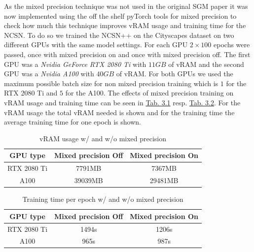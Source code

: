 As the mixed precision technique was not used in the original SGM paper \cite{score_3} it was now implemented using the off the shelf pyTorch tools for mixed precision to check how much this technique improves vRAM usage and training time for the NCSN. To do so we trained the NCSN++ on the Cityscapes dataset on two different GPUs with the same model settings. For each GPU $2\times100$ epochs were passed, once with mixed precision on and once with mixed precision off. The first GPU was a \textit{Nvidia GeForce RTX 2080 Ti} with $11GB$ of vRAM and the second GPU was a \textit{Nvidia A100} with $40GB$ of vRAM. For both GPUs we used the maximum possible batch size for non mixed precision training which is $1$ for the RTX 2080 Ti and $5$ for the A100. The effects of mixed precision training on vRAM usage and training time can be seen in \hyperref[tab:3.1]{Tab. 3.1} resp. \hyperref[tab:3.1]{Tab. 3.2}. For the vRAM usage the total vRAM needed is shown and for the training time the average training time for one epoch is shown.
%
\begin{table}[] \label{tab:3.1}
        \centering
    \begin{tabular}{c|c|c}
        \toprule
        GPU type        & Mixed precision \textbf{Off}    & Mixed precision \textbf{On} \\
        \midrule
        RTX 2080 Ti     &  7791MB               & 7367MB\\
        A100            &  39039MB              & 29481MB\\
        \bottomrule
    \end{tabular}
    \caption{vRAM usage w/ and w/o mixed precision}
\end{table}
\begin{table}[b] \label{tab:3.2}
        \centering
    \begin{tabular}{c|c|c}
        \toprule
        GPU type        & Mixed precision \textbf{Off}    & Mixed precision \textbf{On} \\
        \midrule
        RTX 2080 Ti     &  1494s                & 1206s    \\
        A100            &  965s                 & 987s\\
        \bottomrule
    \end{tabular}
    \caption{Training time per epoch w/ and w/o mixed precision}
\end{table}


